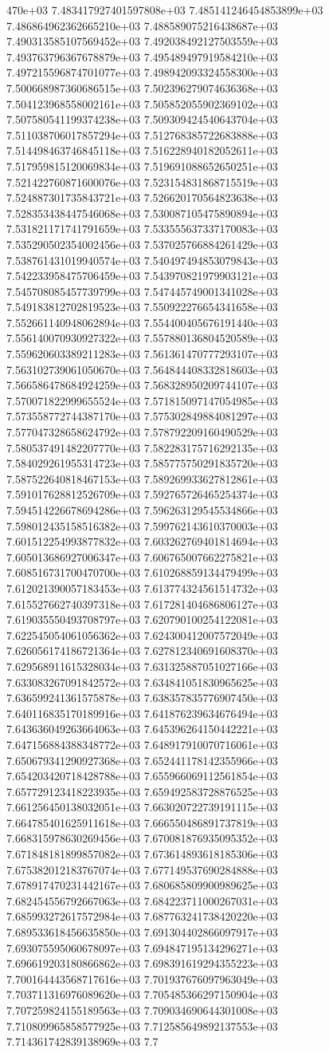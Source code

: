 470e+03	7.483417927401597808e+03	7.485141246454853899e+03	7.486864962362665210e+03	7.488589075216438687e+03	7.490313585107569452e+03	7.492038492127503559e+03	7.493763796367678879e+03	7.495489497919584210e+03	7.497215596874701077e+03	7.498942093324558300e+03	7.500668987360686515e+03	7.502396279074636368e+03	7.504123968558002161e+03	7.505852055902369102e+03	7.507580541199374238e+03	7.509309424540643704e+03	7.511038706017857294e+03	7.512768385722683888e+03	7.514498463746845118e+03	7.516228940182052611e+03	7.517959815120069834e+03	7.519691088652650251e+03	7.521422760871600076e+03	7.523154831868715519e+03	7.524887301735843721e+03	7.526620170564823638e+03	7.528353438447546068e+03	7.530087105475890894e+03	7.531821171741791659e+03	7.533555637337170083e+03	7.535290502354002456e+03	7.537025766884261429e+03	7.538761431019940574e+03	7.540497494853079843e+03	7.542233958475706459e+03	7.543970821979903121e+03	7.545708085457739799e+03	7.547445749001341028e+03	7.549183812702819523e+03	7.550922276654341658e+03	7.552661140948062894e+03	7.554400405676191440e+03	7.556140070930927322e+03	7.557880136804520589e+03	7.559620603389211283e+03	7.561361470777293107e+03	7.563102739061050670e+03	7.564844408332818603e+03	7.566586478684924259e+03	7.568328950209744107e+03	7.570071822999655524e+03	7.571815097147054985e+03	7.573558772744387170e+03	7.575302849884081297e+03	7.577047328658624792e+03	7.578792209160490529e+03	7.580537491482207770e+03	7.582283175716292135e+03	7.584029261955314723e+03	7.585775750291835720e+03	7.587522640818467153e+03	7.589269933627812861e+03	7.591017628812526709e+03	7.592765726465254374e+03	7.594514226678694286e+03	7.596263129545534866e+03	7.598012435158516382e+03	7.599762143610370003e+03	7.601512254993877832e+03	7.603262769401814694e+03	7.605013686927006347e+03	7.606765007662275821e+03	7.608516731700470700e+03	7.610268859134479499e+03	7.612021390057183453e+03	7.613774324561514732e+03	7.615527662740397318e+03	7.617281404686806127e+03	7.619035550493708797e+03	7.620790100254122081e+03	7.622545054061056362e+03	7.624300412007572049e+03	7.626056174186721364e+03	7.627812340691608370e+03	7.629568911615328034e+03	7.631325887051027166e+03	7.633083267091842572e+03	7.634841051830965625e+03	7.636599241361575878e+03	7.638357835776907450e+03	7.640116835170189916e+03	7.641876239634676494e+03	7.643636049263664063e+03	7.645396264150442221e+03	7.647156884388348772e+03	7.648917910070716061e+03	7.650679341290927368e+03	7.652441178142355966e+03	7.654203420718428788e+03	7.655966069112561854e+03	7.657729123418223935e+03	7.659492583728876525e+03	7.661256450138032051e+03	7.663020722739191115e+03	7.664785401625911618e+03	7.666550486891737819e+03	7.668315978630269456e+03	7.670081876935095352e+03	7.671848181899857082e+03	7.673614893618185306e+03	7.675382012183767074e+03	7.677149537690284888e+03	7.678917470231442167e+03	7.680685809900989625e+03	7.682454556792667063e+03	7.684223711000267031e+03	7.685993272617572984e+03	7.687763241738420220e+03	7.689533618456635850e+03	7.691304402866097917e+03	7.693075595060678097e+03	7.694847195134296271e+03	7.696619203180866862e+03	7.698391619294355223e+03	7.700164443568717616e+03	7.701937676097963049e+03	7.703711316976089620e+03	7.705485366297150904e+03	7.707259824155189563e+03	7.709034690644301008e+03	7.710809965858577925e+03	7.712585649892137553e+03	7.714361742839138969e+03	7.7